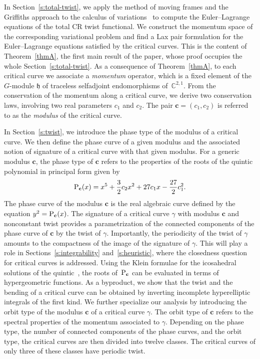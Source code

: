 \documentclass[10pt,a4paper]{amsart}
\numberwithin{equation}{section}
\begin{document}
In Section~\ref{s:total-twist},
we apply the method of moving frames
and the Griffiths approach to the calculus of variations~\cite{Gr,Hsu, GM} to compute the Euler--Lagrange equations
of the total CR twist functional.
We construct the momentum space of the corresponding variational problem
%
and find a Lax pair formulation for the Euler--Lagrange equations satisfied by the critical curves.
This is the content of Theorem~\ref{thmA}, the first main result of the paper, whose proof occupies
the whole Section~\ref{s:total-twist}.
As a consequence of Theorem~\ref{thmA},
%
to each critical curve we associate a \textit{momentum} operator, which is
a fixed element of the $G$-module $\mathfrak{h}$
of traceless selfadjoint endomorphisms of~$\mathbb{C}^{2,1}$.
From the conservation of the momentum along a critical curve,
we derive two conservation laws, involving two
real parameters $c_1$ and $c_2$.
The pair $\mathbf{c}=(c_1,c_2)$ is referred to as the \textit{modulus} of the critical curve.

In Section~\ref{s:twist},
we introduce the phase type of the modulus of a critical curve. We then define the phase curve
of a
given modulus and the associated notion of signature of a critical curve with that given modulus.
For a generic modulus $\mathbf{c}$, the phase type of $\mathbf{c}$ refers to the properties of the roots
of the quintic polynomial in principal form given by
\[{\rm P}_{\mathbf{c}}(x)=x^5+\frac{3}{2}c_2x^2+27c_1x-\frac{27}{2}c_1^2 .\]
The phase curve of
the modulus $\mathbf{c}$ is the real algebraic curve
defined by the equation ${y^2={\rm P}_{\mathbf{c}}(x)}$.
The signature of a critical curve $\gamma$ with modulus $\mathbf{c}$ and nonconstant twist
provides a parametrization of the connected components of the
phase curve of $\mathbf{c}$ by the twist of $\gamma$. Importantly, the periodicity of the twist of $\gamma$
amounts to the compactness of the image of the signature of $\gamma$.
This will play a role in Sections~\ref{s:integrability}
and~\ref{s:heuristic}, where the closedness question for critical curves is addressed.
Using the Klein formulae for the icosahedral solutions of the quintic~\cite{K,Na,Tr},
the roots of~${\rm P}_{\mathbf{c}}$
can be evaluated in terms of hypergeometric functions. As a byproduct, we show that the twist
and the bending of a
critical curve can be obtained by inverting incomplete hyperelliptic integrals of the first kind.
We further specialize our analysis by introducing the orbit type of the modulus $\mathbf{c}$ of a
critical curve $\gamma$. The orbit type of $\mathbf{c}$ refers to the spectral properties of the momentum associated to $\gamma$.
Depending on the phase type, the number of connected components of the phase curves,
and the orbit type, the critical curves are then divided into twelve classes.
The critical curves of only three of these classes have periodic twist.
\end{document}
